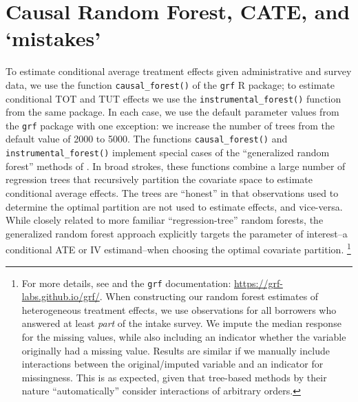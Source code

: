 \begin{appendix}
\begin{figure}
\label{te_rankinvariance}
\end{figure}
   


\section{ Causal Random Forest, CATE, and `mistakes'}\label{app:cate}


To estimate conditional average treatment effects given administrative and survey data, we use the function \texttt{causal\_forest()} of the \texttt{grf} R package; to estimate conditional TOT and TUT effects we use the \texttt{instrumental\_forest()} function from the same package.
In each case, we use the default parameter values from the \texttt{grf} package with one exception: we increase the number of trees from the default value of 2000 to 5000.
The functions \texttt{causal\_forest()} and \texttt{instrumental\_forest()} implement special cases of the ``generalized random forest'' methods of \cite{atheygrf}.
In broad strokes, these functions combine a large number of regression trees that recursively partition the covariate space to estimate conditional average effects.
The trees are ``honest'' in that observations used to determine the optimal partition are not used to estimate effects, and vice-versa.
While closely related to more familiar ``regression-tree'' random forests, the generalized random forest approach explicitly targets the parameter of interest--a conditional ATE or IV estimand--when choosing the optimal covariate partition.
\footnote{For more details, see \cite{atheygrf} and the \texttt{grf} documentation: \url{https://grf-labs.github.io/grf/}. When constructing our random forest estimates of heterogeneous treatment effects, we use observations for all borrowers who answered at least \emph{part} of the intake survey.
We impute the median response for the missing values, while also including an indicator whether the variable originally had a missing value. Results are similar if we manually include interactions between the original/imputed variable and an indicator for missingness. This is as expected, given that tree-based methods by their nature ``automatically'' consider interactions of arbitrary orders.}


\end{appendix}
